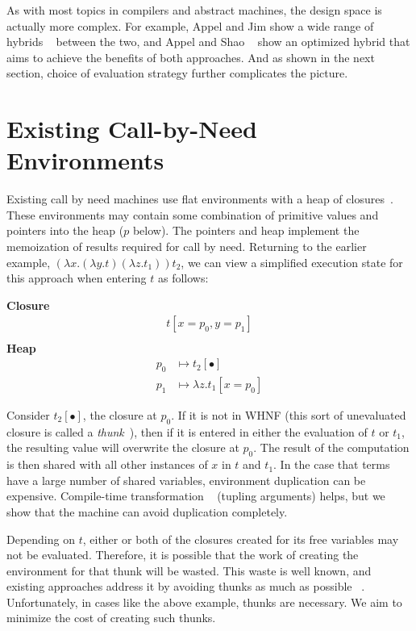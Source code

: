 As with most topics in compilers and abstract machines, the design space is
actually more complex. For example, Appel and Jim show a wide range of hybrids
~\cite{appel1988optimizing} between the two, and Appel and Shao
~\cite{shao1994space} show an optimized hybrid that aims to achieve the benefits
of both approaches. And as shown in the next section, choice of evaluation
strategy further complicates the picture.

\section{Existing Call-by-Need Environments} \label{sec:exist}

Existing call by need machines use flat environments with a heap of
closures~\cite{jonesstg,TIM,johnsson1984efficient,boquist1997grin}. These
environments may contain some combination of primitive values and pointers into the
heap ($p$ below). The pointers and heap implement the memoization of results
required for call by need. Returning to the earlier example, $(\lambda
x.(\lambda y.t) (\lambda z.t_1)) t_2$, we can view a simplified execution state
for this approach when entering $t$ as follows:

\begin{center}
\textbf{Closure}
\begin{align*}
t[x=p_0, y=p_1] \\
\end{align*}
\textbf{Heap}
\begin{align*}
p_0 &\mapsto t_2[\bullet] \\
p_1 &\mapsto \lambda z.t_1[x=p_0] 
\end{align*}
\end{center}

Consider $t_2[\bullet]$, the closure at $p_0$. If it is not in WHNF (this sort
of unevaluated closure is called a
\emph{thunk}~\cite{ingerman1961way,peyton1992implementing}), then if it is
entered in either the evaluation of $t$ or $t_1$, the resulting value will
overwrite the closure at $p_0$. The result of the computation is then shared
with all other instances of $x$ in $t$ and $t_1$. In the case that terms have a
large number of shared variables, environment duplication can be expensive.
Compile-time transformation ~\cite{peyton1992implementing} (tupling arguments)
helps, but we show that the machine can avoid duplication completely.

Depending on $t$, either or both of the closures created for its free variables
may not be evaluated. Therefore, it is possible that the work of creating the
environment for that thunk will be wasted. This waste is well known, and
existing approaches address it by avoiding thunks as much as possible
~\cite{jonesstg,johnsson1984efficient}. Unfortunately, in cases like the above
example, thunks are necessary. We aim to minimize the cost of creating such
thunks.

